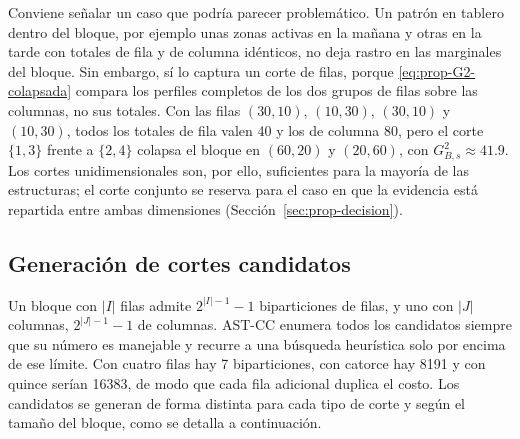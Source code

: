 Conviene señalar un caso que podría parecer problemático. Un patrón en tablero
dentro del bloque, por ejemplo unas zonas activas en la mañana y otras en la
tarde con totales de fila y de columna idénticos, no deja rastro en las
marginales del bloque. Sin embargo, sí lo captura un corte de filas, porque
\eqref{eq:prop-G2-colapsada} compara los perfiles completos de los dos
grupos de filas sobre las columnas, no sus totales. Con las filas $(30,10)$,
$(10,30)$, $(30,10)$ y $(10,30)$, todos los totales de fila valen 40 y los de
columna 80, pero el corte $\{1,3\}$ frente a $\{2,4\}$ colapsa el bloque en
$(60,20)$ y $(20,60)$, con $G^2_{B,s}\approx 41.9$. Los cortes unidimensionales
son, por ello, suficientes para la mayoría de las estructuras; el corte conjunto
se reserva para el caso en que la evidencia está repartida entre ambas
dimensiones (Sección~\ref{sec:prop-decision}).

\subsection{Generación de cortes candidatos}\label{sec:prop-candidatos}

Un bloque con $|I|$ filas admite $2^{|I|-1}-1$ biparticiones de filas, y uno
con $|J|$ columnas, $2^{|J|-1}-1$ de columnas. AST-CC enumera todos los
candidatos siempre que su número es manejable y recurre a una búsqueda
heurística solo por encima de ese límite. Con cuatro filas hay 7 biparticiones,
con catorce hay 8191 y con quince serían 16383, de modo que cada fila adicional
duplica el costo. Los candidatos se generan de forma
distinta para cada tipo de corte y según el tamaño del bloque, como se detalla a
continuación.

